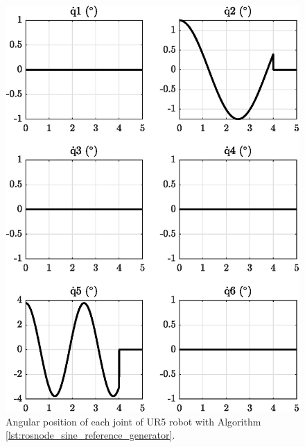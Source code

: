 \begin{figure}
    \centering
    \includegraphics{images/exp1.1/joint_velocity.eps}
    \caption{Angular position of each joint of UR5 robot with Algorithm \ref{lst:rosnode_sine_reference_generator}.}
    \label{fig:act1.1_joint_velocity}
\end{figure}

